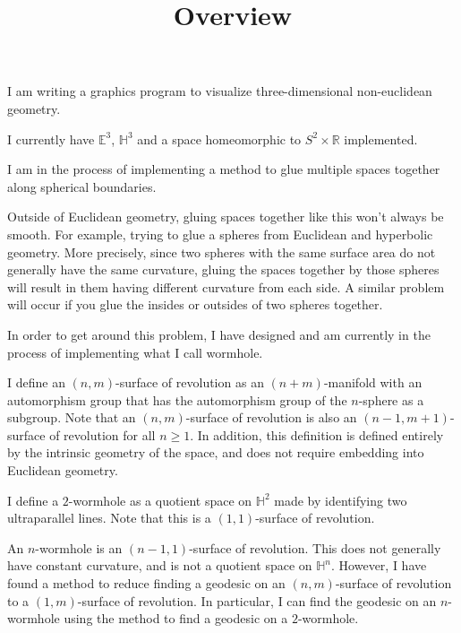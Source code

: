 \documentclass[12pt]{amsart}
\begin{document}
\title{Overview}
\maketitle

I am writing a graphics program to visualize three-dimensional non-euclidean geometry.

I currently have $\mathbb{E}^3$, $\mathbb{H}^3$ and a space homeomorphic to $S^2 \times \mathbb{R}$ implemented.

I am in the process of implementing a method to glue multiple spaces together along spherical boundaries.

Outside of Euclidean geometry, gluing spaces together like this won't always be smooth. For example, trying to glue a spheres from Euclidean and hyperbolic geometry. More precisely, since two spheres with the same surface area do not generally have the same curvature, gluing the spaces together by those spheres will result in them having different curvature from each side. A similar problem will occur if you glue the insides or outsides of two spheres together.

In order to get around this problem, I have designed and am currently in the process of implementing what I call wormhole.

I define an $(n,m)$-surface of revolution as an $(n+m)$-manifold with an automorphism group that has the automorphism group of the $n$-sphere as a subgroup. Note that an $(n,m)$-surface of revolution is also an $(n-1,m+1)$-surface of revolution for all $n \geq 1$. In addition, this definition is defined entirely by the intrinsic geometry of the space, and does not require embedding into Euclidean geometry.


I define a $2$-wormhole as a quotient space on $\mathbb{H}^2$ made by identifying two ultraparallel lines. Note that this is a $(1,1)$-surface of revolution.

An $n$-wormhole is an $(n-1,1)$-surface of revolution. This does not generally have constant curvature, and is not a quotient space on $\mathbb{H}^n$. However, I have found a method to reduce finding a geodesic on an $(n,m)$-surface of revolution to a $(1,m)$-surface of revolution. In particular, I can find the geodesic on an $n$-wormhole using the method to find a geodesic on a $2$-wormhole.
\end{document}
